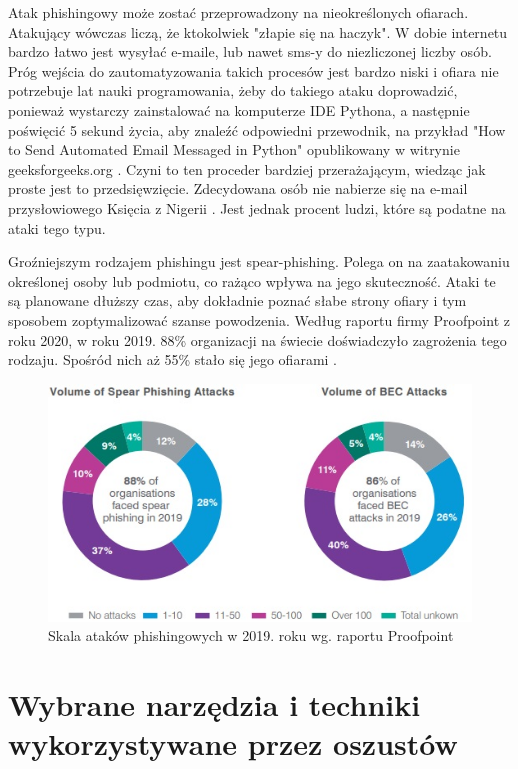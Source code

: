 \documentclass[]{article}
\begin{document}
Atak phishingowy może zostać przeprowadzony na nieokreślonych ofiarach. Atakujący wówczas liczą, że ktokolwiek "złapie się na haczyk". W dobie internetu bardzo łatwo jest wysyłać e-maile, lub nawet sms-y do niezliczonej liczby osób. Próg wejścia do zautomatyzowania takich procesów jest bardzo niski i ofiara nie potrzebuje lat nauki programowania, żeby do takiego ataku doprowadzić, ponieważ wystarczy zainstalować na komputerze IDE Pythona, a następnie poświęcić 5 sekund życia, aby znaleźć odpowiedni przewodnik, na przykład "How to Send Automated Email Messaged in Python" opublikowany w witrynie geeksforgeeks.org \cite{geeks4geeks_automaticmails}. Czyni to ten proceder bardziej przerażającym, wiedząc jak proste jest to przedsięwzięcie. Zdecydowana osób nie nabierze się na e-mail przysłowiowego Księcia z Nigerii \cite{nigerian_prince}. Jest jednak procent ludzi, które są podatne na ataki tego typu.

Groźniejszym rodzajem phishingu jest spear-phishing. Polega on na zaatakowaniu określonej osoby lub podmiotu, co rażąco wpływa na jego skuteczność. Ataki te są planowane dłuższy czas, aby dokładnie poznać słabe strony ofiary i tym sposobem zoptymalizować szanse powodzenia. Według raportu firmy Proofpoint z roku 2020, w roku 2019. 88\% organizacji na świecie doświadczyło zagrożenia tego rodzaju. Spośród nich aż 55\% stało się jego ofiarami \cite{proofpoint2020}.

\begin{figure}
	\centering
	\includegraphics[width=0.8\linewidth]{Pictures/proofpoint_phishing2019.jpg}
	\caption{Skala ataków phishingowych w 2019. roku wg. raportu Proofpoint}
	\label{fig:pp_phishing2019}
\end{figure}

\newpage
\section{Wybrane narzędzia i techniki wykorzystywane przez oszustów}
\end{document}
